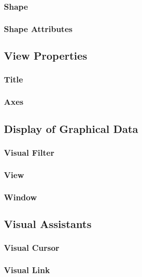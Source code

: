 \subsubsection{Shape}
\subsubsection{Shape Attributes}

\subsection{View Properties}

\subsubsection{Title}
\subsubsection{Axes}

\newpage

\subsection{Display of Graphical Data}

\subsubsection{Visual Filter}

\subsubsection{View}

\subsubsection{Window}

\subsection{Visual Assistants}

\subsubsection{Visual Cursor}

\subsubsection{Visual Link}

